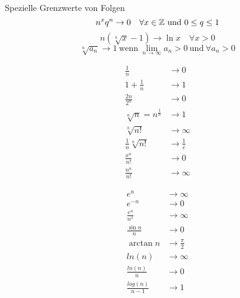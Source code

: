 \begin{highlight}{Spezielle Grenzwerte von Folgen}
    \begin{equation*}
        n^x q^n \to 0 \quad \forall x \in \mathbb{Z}~\text{und}~0 \leq q \leq 1
    \end{equation*}
    \begin{equation*}
         n(\sqrt[n]{x} - 1) \to \ln x \quad \forall x>0
    \end{equation*}
    \begin{equation*}
        \sqrt[n]{a_n} \to 1 ~\text{wenn}~ \lim_{n \to \infty} a_n > 0 ~\text{und}~ \forall a_n > 0
    \end{equation*}
    \begin{center}
        \begin{minipage}{0.3\linewidth}
            \begin{align*}
                \frac{1}{n} &\to 0\\
                1 + \frac{1}{n} &\to 1\\
                \frac{2n}{2^n} &\to 0\\
                \sqrt[n]{n} = n^{\frac{1}{n}} &\to 1\\
                \sqrt[n]{n!} &\to \infty\\
                \frac{1}{n}\sqrt[n]{n!} &\to \frac{1}{e}\\
                \frac{x^n}{n!} &\to 0\\
                \frac{n^n}{n!} &\to \infty
            \end{align*}
        \end{minipage}
        \hfill\vline\hfill
        \begin{minipage}{0.3\linewidth}
            \begin{align*}
                e^n &\to \infty\\
                e^{-n} &\to 0\\
                \frac{e^n}{n^x} &\to \infty\\
                \frac{\sin n}{n} &\to 0\\
                \arctan n &\to \frac{\pi}{2}\\
                ln(n) &\to \infty\\
                \frac{ln(n)}{n} &\to 0\\
                \frac{log(n)}{n - 1} &\to 1
            \end{align*}
        \end{minipage}
        \hfill\vline\hfill

\end{center}
\end{highlight}
